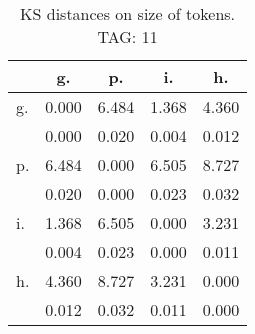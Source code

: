 \begin{table}[h!]
\begin{center}
\begin{tabular}{| l | c | c | c | c |}\hline
 & g. & p. & i. & h. \\\hline
g. & 0.000  & 6.484  & 1.368  & 4.360 \\\hline
 & 0.000  & 0.020  & 0.004  & 0.012 \\\hline
p. & 6.484  & 0.000  & 6.505  & 8.727 \\\hline
 & 0.020  & 0.000  & 0.023  & 0.032 \\\hline
i. & 1.368  & 6.505  & 0.000  & 3.231 \\\hline
 & 0.004  & 0.023  & 0.000  & 0.011 \\\hline
h. & 4.360  & 8.727  & 3.231  & 0.000 \\\hline
 & 0.012  & 0.032  & 0.011  & 0.000 \\\hline
\end{tabular}
\caption{KS distances on size of tokens. TAG: 11}
\end{center}
\end{table}